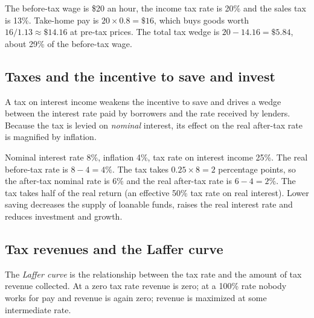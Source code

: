 \begin{example}
The before-tax wage is \$20 an hour, the income tax rate is 20\% and the sales tax is
13\%. Take-home pay is $20 \times 0.8 = \$16$, which buys goods worth
$16/1.13 \approx \$14.16$ at pre-tax prices. The total tax wedge is
$20 - 14.16 = \$5.84$, about 29\% of the before-tax wage.
\end{example}

\subsection{Taxes and the incentive to save and invest}

A tax on interest income weakens the incentive to save and drives a wedge between the
interest rate paid by borrowers and the rate received by lenders. Because the tax is
levied on \emph{nominal} interest, its effect on the real after-tax rate is magnified by
inflation.

\begin{example}
Nominal interest rate 8\%, inflation 4\%, tax rate on interest income 25\%. The real
before-tax rate is $8 - 4 = 4\%$. The tax takes $0.25 \times 8 = 2$ percentage points, so the
after-tax nominal rate is 6\% and the real after-tax rate is $6 - 4 = 2\%$. The tax takes
half of the real return (an effective 50\% tax rate on real interest). Lower saving
decreases the supply of loanable funds, raises the real interest rate and reduces
investment and growth.
\end{example}

\subsection{Tax revenues and the Laffer curve}

\begin{definition}
The \emph{Laffer curve} is the relationship between the tax rate and the amount of tax
revenue collected. At a zero tax rate revenue is zero; at a 100\% rate nobody works for
pay and revenue is again zero; revenue is maximized at some intermediate rate.
\end{definition}

\begin{center}
\end{center}

